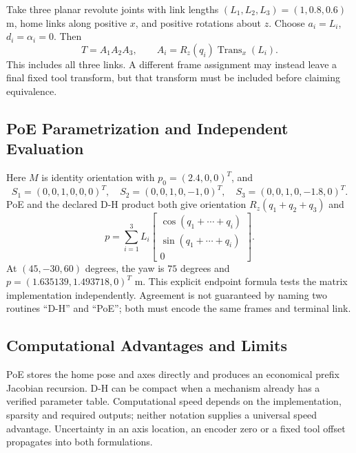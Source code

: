 Take three planar revolute joints with link lengths $(L_1,L_2,L_3)=(1,0.8,0.6)$ m, home links along positive $x$, and positive rotations about $z$. Choose $a_i=L_i$, $d_i=\alpha_i=0$. Then
\begin{equation}
 T=A_1A_2A_3,\qquad A_i=R_z(q_i)\operatorname{Trans}_x(L_i).
\end{equation}
This includes all three links. A different frame assignment may instead leave a final fixed tool transform, but that transform must be included before claiming equivalence.

\subsection{PoE Parametrization and Independent Evaluation}
\label{subsec:poe_example}

Here $M$ is identity orientation with $p_0=(2.4,0,0)^T$, and
\begin{equation}
 S_1=(0,0,1,0,0,0)^T,\quad
 S_2=(0,0,1,0,-1,0)^T,\quad
 S_3=(0,0,1,0,-1.8,0)^T.
\end{equation}
PoE and the declared D-H product both give orientation $R_z(q_1+q_2+q_3)$ and
\begin{equation}
 p=\sum_{i=1}^3 L_i
 \begin{bmatrix}\cos(q_1+\cdots+q_i)\\\sin(q_1+\cdots+q_i)\\0\end{bmatrix}.
\end{equation}
At $(45,-30,60)$ degrees, the yaw is $75$ degrees and $p=(1.635139,1.493718,0)^T$ m. This explicit endpoint formula tests the matrix implementation independently. Agreement is not guaranteed by naming two routines ``D-H'' and ``PoE''; both must encode the same frames and terminal link.

\subsection{Computational Advantages and Limits}
\label{subsec:poe_advantages}

PoE stores the home pose and axes directly and produces an economical prefix Jacobian recursion. D-H can be compact when a mechanism already has a verified parameter table. Computational speed depends on the implementation, sparsity and required outputs; neither notation supplies a universal speed advantage. Uncertainty in an axis location, an encoder zero or a fixed tool offset propagates into both formulations.

